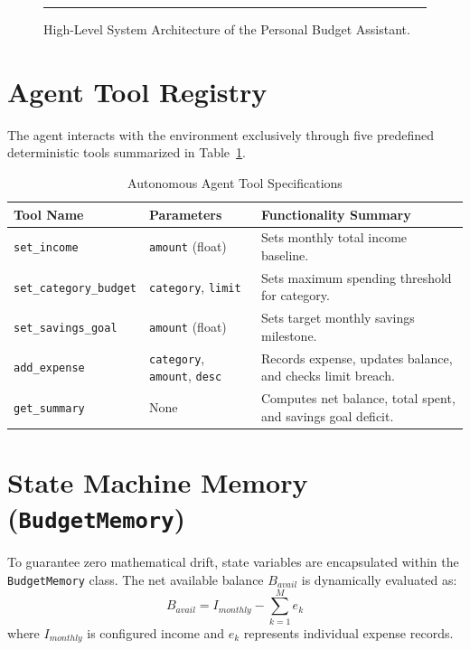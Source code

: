 \documentclass[12pt,a4paper,oneside]{report}
\begin{document}
\begin{figure}[htbp]
    \centering
    \rule{0.8\textwidth}{4cm} %
    \caption{High-Level System Architecture of the Personal Budget Assistant.}
    \label{fig:arch}
\end{figure}

\section{Agent Tool Registry}
The agent interacts with the environment exclusively through five predefined deterministic tools summarized in Table~\ref{tab:tools}.

\begin{table}[htbp]
    \centering
    \caption{Autonomous Agent Tool Specifications}
    \label{tab:tools}
    \begin{tabular}{@{}llp{7cm}@{}}
        \toprule
        \textbf{Tool Name} & \textbf{Parameters} & \textbf{Functionality Summary} \\
        \midrule
        \texttt{set\_income} & \texttt{amount} (float) & Sets monthly total income baseline. \\
        \texttt{set\_category\_budget} & \texttt{category}, \texttt{limit} & Sets maximum spending threshold for category. \\
        \texttt{set\_savings\_goal} & \texttt{amount} (float) & Sets target monthly savings milestone. \\
        \texttt{add\_expense} & \texttt{category}, \texttt{amount}, \texttt{desc} & Records expense, updates balance, and checks limit breach. \\
        \texttt{get\_summary} & None & Computes net balance, total spent, and savings goal deficit. \\
        \bottomrule
    \end{tabular}
\end{table}

\section{State Machine Memory (\texttt{BudgetMemory})}
To guarantee zero mathematical drift, state variables are encapsulated within the \texttt{BudgetMemory} class. The net available balance $B_{avail}$ is dynamically evaluated as:
\begin{equation}
B_{avail} = I_{monthly} - \sum_{k=1}^M e_k
\end{equation}
where $I_{monthly}$ is configured income and $e_k$ represents individual expense records.
\end{document}
